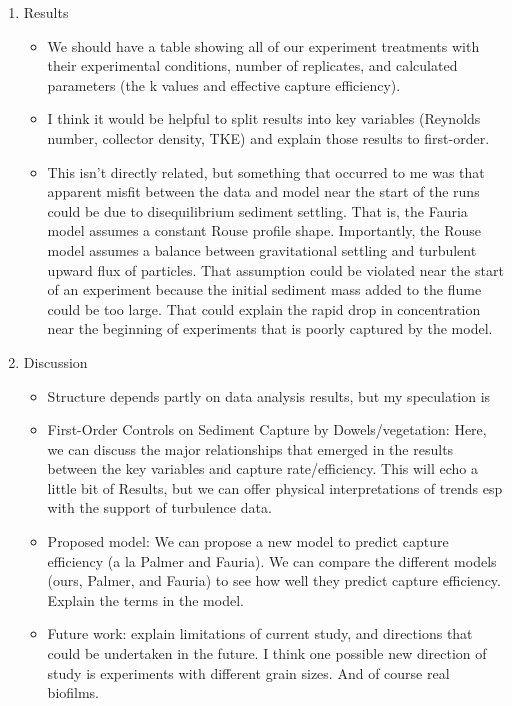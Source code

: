 \begin{enumerate}
    \item Results
    \begin{itemize}
        \item We should have a table showing all of our experiment treatments with their experimental conditions, number of replicates, and calculated parameters (the k values and effective capture efficiency).
        \item I think it would be helpful to split results into key variables (Reynolds number, collector density, TKE) and explain those results to first-order.
        \item This isn't directly related, but something that occurred to me was that apparent misfit between the data and model near the start of the runs could be due to disequilibrium sediment settling. That is, the Fauria model assumes a constant Rouse profile shape. Importantly, the Rouse model assumes a balance between gravitational settling and turbulent upward flux of particles. That assumption could be violated near the start of an experiment because the initial sediment mass added to the flume could be too large. That could explain the rapid drop in concentration near the beginning of experiments that is poorly captured by the model.
    \end{itemize}
    
    \item Discussion
    \begin{itemize}
        \item Structure depends partly on data analysis results, but my speculation is
        \item First-Order Controls on Sediment Capture by Dowels/vegetation: Here, we can discuss the major relationships that emerged in the results between the key variables and capture rate/efficiency. This will echo a little bit of Results, but we can offer physical interpretations of trends esp with the support of turbulence data.
        \item Proposed model: We can propose a new model to predict capture efficiency (a la Palmer and Fauria). We can compare the different models (ours, Palmer, and Fauria) to see how well they predict capture efficiency. Explain the terms in the model.
        \item Future work: explain limitations of current study, and directions that could be undertaken in the future. I think one possible new direction of study is experiments with different grain sizes. And of course real biofilms.
    \end{itemize}
    

\end{enumerate}
